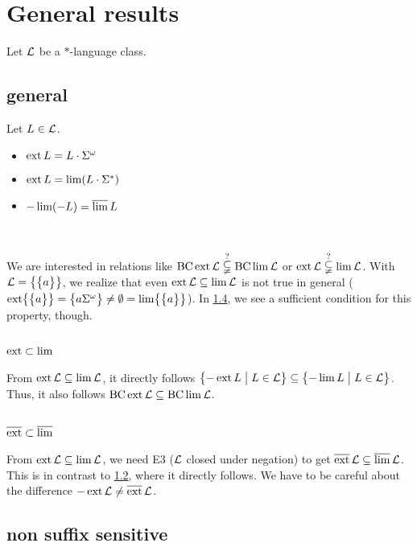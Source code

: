 \section{General results}
\label{general-results}


Let $\mathcal{L}$ be a $*$-language class.

\subsection{general}
Let $L \in \mathcal{L}$.
\begin{itemize}
\item $\operatorname{ext} L = L \cdot \Sigma^\omega$
\item $\operatorname{ext} L = \lim (L \cdot \Sigma^*)$
\item $- \lim(-L) = \operatorname{\overline{lim}} L$
\end{itemize}

\

We are interested in relations like $\operatorname{BC} \operatorname{ext} \mathcal{L} \overset{?}{\subsetneqq} \operatorname{BC} \lim \mathcal{L}$ or $\operatorname{ext} \mathcal{L} \overset{?}{\subsetneqq} \lim \mathcal{L}$. With $\Lang = \Set{\Set{a}}$, we realize that even $\operatorname{ext} \mathcal{L} \subseteq \lim \mathcal{L}$ is not true in general ($\ext \Set{\Set{a}} = \Set{a \Sigma^\omega} \neq \emptyset = \lim \Set{\Set{a}}$). In \ref{gen:non-suffix-sens}, we see a sufficient condition for this property, though.

\subsection{$\operatorname{ext} \subset \lim$}
\label{gen:S302a}

From $\operatorname{ext} \mathcal{L} \subseteq \lim \mathcal{L}$, it directly follows $\Set{-\ext L}{L \in \Lang} \subseteq \Set{-\lim L}{L \in \Lang}$. Thus, it also follows $\operatorname{BC} \operatorname{ext} \mathcal{L} \subseteq \operatorname{BC} \lim \mathcal{L}$.

\subsection{$\operatorname{\overline{ext}} \subset \operatorname{\overline{lim}}$}

From $\operatorname{ext} \mathcal{L} \subseteq \lim \mathcal{L}$, we need E3 ($\mathcal{L}$ closed under negation) to get $\operatorname{\overline{ext}} \mathcal{L} \subseteq \operatorname{\overline{lim}} \mathcal{L}$. This is in contrast to \ref{gen:S302a}, where it directly follows. We have to be careful about the difference $- \operatorname{ext} \mathcal{L} \neq \operatorname{\overline{ext}} \mathcal{L}$. 

\subsection{non suffix sensitive}
\label{gen:non-suffix-sens}

